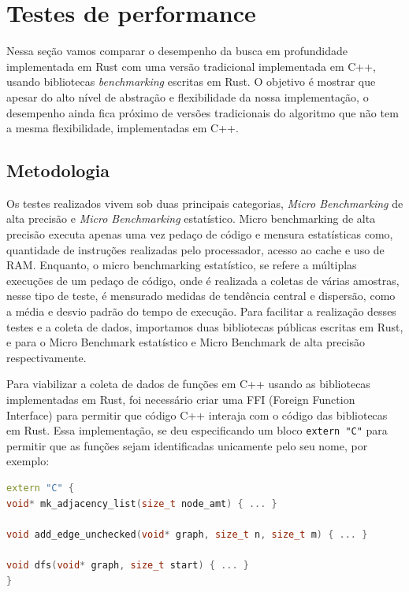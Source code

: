 \chapter{Testes de performance}
\label{ch:performance}

Nessa seção vamos comparar o desempenho da busca em profundidade implementada
em Rust com uma versão tradicional implementada em C++, usando
bibliotecas \textit{benchmarking} escritas em Rust. O
objetivo é mostrar que apesar do alto nível de abstração e
flexibilidade da nossa implementação, o desempenho ainda fica próximo
de versões tradicionais do algoritmo que não tem a mesma
flexibilidade, implementadas em C++.

\section{Metodologia}

Os testes realizados vivem sob duas principais categorias,
\textit{Micro Benchmarking} de alta precisão e \textit{Micro
Benchmarking} estatístico. Micro
benchmarking de alta precisão executa apenas uma vez pedaço de código
e mensura estatísticas como, quantidade de
instruções realizadas pelo processador, acesso ao cache e uso de RAM.
Enquanto, o micro benchmarking estatístico, se refere a múltiplas
execuções de um pedaço de código, onde é realizada a coletas de várias
amostras, nesse tipo de teste, é mensurado medidas de tendência
central e dispersão, como a média e desvio padrão do tempo de execução.
Para facilitar a realização desses testes e a coleta de dados, importamos duas
bibliotecas públicas escritas em Rust, \cite{criterionrust} e
\cite{gungraunrust} para o Micro Benchmark estatístico e Micro
Benchmark de alta precisão respectivamente.

Para viabilizar a coleta de dados de funções em C++ usando as
bibliotecas implementadas em Rust, foi necessário criar uma FFI
(Foreign Function Interface) para permitir que código C++ interaja
com o código das bibliotecas em Rust. Essa implementação, se deu
especificando um bloco \texttt{extern "C"} para permitir que as
funções sejam identificadas unicamente pelo seu nome, por exemplo:

\begin{lstlisting}[language=C++, caption={Exemplo de interface FFI escrita em C++}, label=list:externCFfi]
extern "C" {
void* mk_adjacency_list(size_t node_amt) { ... }

void add_edge_unchecked(void* graph, size_t n, size_t m) { ... }

void dfs(void* graph, size_t start) { ... }
}
\end{lstlisting}

